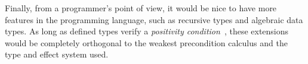 \documentclass[a4paper]{llncs}
\begin{document}
Finally, from a programmer's point of view, it would be nice to have more
features in the programming language, such as recursive types and algebraic
data types. As long as defined types verify a {\em positivity
condition}~\cite{paulintlca93}, these extensions would be completely
orthogonal to the weakest precondition calculus and the type and effect system
used.


{}
\end{document}
